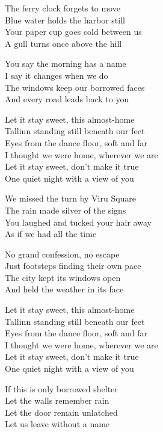 \begin{lyrics}
The ferry clock forgets to move\\
Blue water holds the harbor still\\
Your paper cup goes cold between us\\
A gull turns once above the hill

You say the morning has a name\\
I say it changes when we do\\
The windows keep our borrowed faces\\
And every road leads back to you

Let it stay sweet, this almost-home\\
Tallinn standing still beneath our feet\\
Eyes from the dance floor, soft and far\\
I thought we were home, wherever we are\\
Let it stay sweet, don't make it true\\
One quiet night with a view of you

We missed the turn by Viru Square\\
The rain made silver of the signs\\
You laughed and tucked your hair away\\
As if we had all the time

No grand confession, no escape\\
Just footsteps finding their own pace\\
The city kept its windows open\\
And held the weather in its face

Let it stay sweet, this almost-home\\
Tallinn standing still beneath our feet\\
Eyes from the dance floor, soft and far\\
I thought we were home, wherever we are\\
Let it stay sweet, don't make it true\\
One quiet night with a view of you

If this is only borrowed shelter\\
Let the walls remember rain\\
Let the door remain unlatched\\
Let us leave without a name


\end{lyrics}
